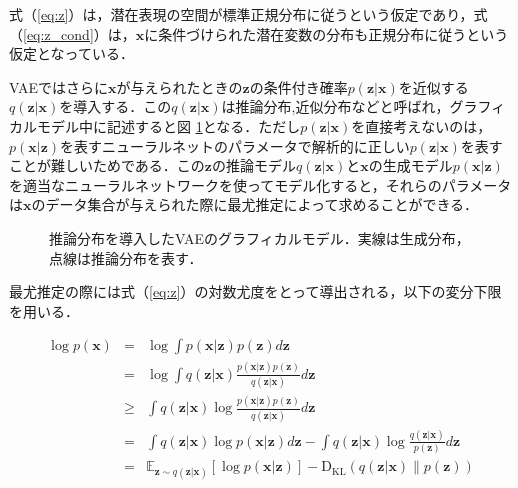 式（\ref{eq:z}）は，潜在表現の空間が標準正規分布に従うという仮定であり，式（\ref{eq:z_cond}）は，$\bm{x}$に条件づけられた潜在変数の分布も正規分布に従うという仮定となっている．

VAEではさらに$\bm{x}$が与えられたときの$\bm{z}$の条件付き確率$p(\bm{z}|\bm{x})$を近似する$q(\bm{z}|\bm{x})$を導入する．この$q(\bm{z}|\bm{x})$は推論分布,近似分布などと呼ばれ，グラフィカルモデル中に記述すると図 \ref{fig:vae_cond}となる．ただし$p(\bm{z}|\bm{x})$を直接考えないのは，$p(\bm{x}|\bm{z})$を表すニューラルネットのパラメータで解析的に正しい$p(\bm{z}|\bm{x})$を表すことが難しいためである．この$\bm{z}$の推論モデル$q(\bm{z}|\bm{x})$と$\bm{x}$の生成モデル$p(\bm{x}|\bm{z})$を適当なニューラルネットワークを使ってモデル化すると，それらのパラメータは$\bm{x}$のデータ集合が与えられた際に最尤推定によって求めることができる．

\begin{figure}[tp]
  \begin{center}
    \caption[推論分布を導入したVAEのグラフィカルモデル]{推論分布を導入したVAEのグラフィカルモデル．実線は生成分布，点線は推論分布を表す．}
    \label{fig:vae_cond}
  \end{center}
\end{figure}

最尤推定の際には式（\ref{eq:z}）の対数尤度をとって導出される，以下の変分下限を用いる．

\begin{eqnarray}
  \log p(\bm{x}) &=& \log \int p(\bm{x}|\bm{z}) p(\bm{z}) d\bm{z} \label{eq:no_replace} \\
  &=& \log \int q(\bm{z}|\bm{x}) \frac{p(\bm{x}|\bm{z}) p(\bm{z})}{q(\bm{z}|\bm{x})} d\bm{z} \label{eq:replace} \\
  &\geq& \int q(\bm{z}|\bm{x}) \log \frac{p(\bm{x}|\bm{z}) p(\bm{z})}{q(\bm{z}|\bm{x})} d\bm{z} \label{eq:jensen}\\
  &=& \int q(\bm{z}|\bm{x}) \log p(\bm{x}|\bm{z}) d\bm{z} - \int q(\bm{z}|\bm{x}) \log \frac{q(\bm{z}|\bm{x})}{p(\bm{z})} d\bm{z} \nonumber \\
  &=& \mathbb{E}_{\bm{z} \sim q(\bm{z}|\bm{x})} [\log p(\bm{x}|\bm{z})] - \mathrm{D_{KL}}(q(\bm{z}|\bm{x}) \| p(\bm{z})) \label{eq:elbo}
\end{eqnarray}


